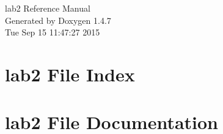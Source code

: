 \documentclass[a4paper]{book}
\begin{document}
\begin{titlepage}
\vspace*{7cm}
\begin{center}
{\Large lab2 Reference Manual}\\
\vspace*{1cm}
{\large Generated by Doxygen 1.4.7}\\
\vspace*{0.5cm}
{\small Tue Sep 15 11:47:27 2015}\\
\end{center}
\end{titlepage}
\clearemptydoublepage
{}
\tableofcontents
\clearemptydoublepage
{}
\chapter{lab2 File Index}

\chapter{lab2 File Documentation}








\printindex
\end{document}
